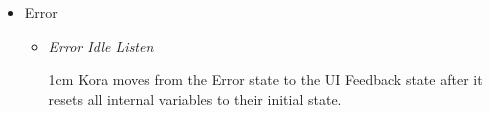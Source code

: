 \documentclass[onecolumn, draftclsnofoot,10pt, compsoc]{IEEEtran}
\newenvironment{indentItem}[1][1cm]{\begin{adjustwidth}{#1}{}}{\end{adjustwidth}}
\begin{document}
\begin{itemize}
		\item Error
		\begin{itemize}
			\item \textit{Error \textrightarrow{} Idle Listen}
			\begin{indentItem}
				Kora moves from the Error state to the UI Feedback state after it resets all internal variables to their initial state.
			\end{indentItem}
		\end{itemize}
	\end{itemize}






%
%
\end{document}
